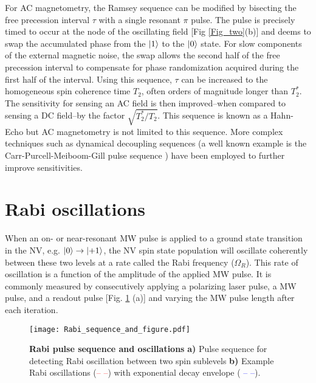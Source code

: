For AC magnetometry, the Ramsey sequence can be modified by bisecting the free precession interval $\tau$ with a single resonant $\pi$ pulse. The pulse is precisely timed to occur at the node of the oscillating field [Fig \ref{Fig_two}(b)] and deems to swap the accumulated phase from the $\ket{1}$ to the $\ket{0}$ state. For slow components of the external magnetic noise, the swap allows the second half of the free precession interval to compensate for phase randomization acquired during the first half of the interval. Using this sequence, $\tau$ can be increased to the homogeneous spin coherence time $T_2$, often orders of magnitude longer than $T_2^*$. The sensitivity for sensing an AC field is then improved--when compared to sensing a DC field--by the factor $\sqrt{T_2^*/T_2}$. This sequence is known as a Hahn-Echo but AC magnetometry is not limited to this sequence. More complex techniques such as dynamical decoupling sequences (a well known example is the Carr-Purcell-Meiboom-Gill pulse sequence \cite{carr1954effects,meiboom1958modified}) have been employed to further improve sensitivities.


\section{Rabi oscillations} \label{Rabi}

When an on- or near-resonant MW pulse is applied to a ground state transition in the NV, e.g. $\ket{0} \rightarrow \ket{+1}$, the NV spin state population will oscillate coherently between these two levels at a rate called the Rabi frequency ($\Omega_R$). This rate of oscillation is a function of the amplitude of the applied MW pulse. It is commonly measured by consecutively applying a polarizing laser pulse, a MW pulse, and a readout pulse [Fig. \ref{Fig1_3} (a)] and varying the MW pulse length after each iteration. 

\begin{figure}[t!]
\centering
\texttt{[image: Rabi\_sequence\_and\_figure.pdf]}  
\caption{\textbf{Rabi pulse sequence and oscillations} \textbf{a)} Pulse sequence for detecting Rabi oscillation between two spin sublevels \textbf{b)} Example Rabi oscillations (\textcolor{red}{-- --}) with exponential decay envelope (\textcolor{blue}{ -- --}).}
\label{Fig1_3}
\end{figure}

